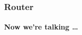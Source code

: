 \documentclass[t]{beamer}
\begin{document}
\begin{frame}
    \frametitle{Router}
    \framesubtitle{Now we're talking …}
    \begin{columns}[T]
        \begin{column}{0.1\textwidth}
            ~
        \end{column}
        \begin{column}{0.4\textwidth}
            \vspace{1.2mm}
        \end{column}
        \begin{column}{0.4\textwidth}
            \vspace{1.2mm}
        \end{column}
        \begin{column}{0.1\textwidth}
            ~
        \end{column}
    \end{columns}
\end{frame}
\end{document}
